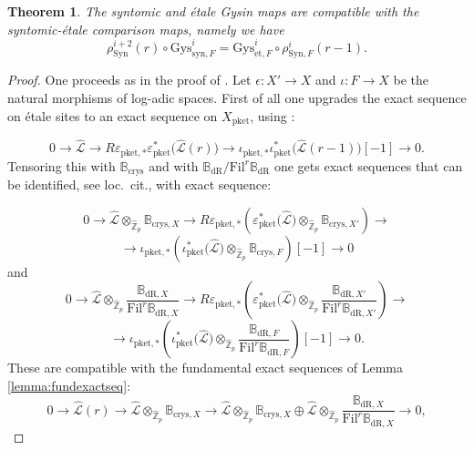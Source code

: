 \documentclass[asterisque,english]{smfart}
\newtheorem{theorem}{Theorem}[]
\begin{document}
\begin{theorem}\label{thm:Gysinandsyntcomp} The syntomic and \'etale Gysin maps are compatible with the syntomic-\'etale comparison maps, namely we have $$\rho_{\mathrm{Syn}}^{i+2}(r) \circ \mathrm{Gys}_{\mathrm{syn},F}^i= \mathrm{Gys}_{\mathrm{et},F}^i \circ \rho_{\mathrm{Syn},F}^{i}(r-1). $$

\end{theorem}
\begin{proof} One proceeds as in the proof of \cite[Prop. 4.3.17]{LLZ}. Let $\epsilon\colon X'\to X$ and $\iota\colon F\to X$ be the natural morphisms of log-adic spaces.  First of all one upgrades the exact sequence on \'etale sites to an exact sequence on $X_{\mathrm{pket}}$, using \cite[Lemma 4.5.7 \& Lemma 4.5.8]
{DLLZa}:

$$0\longrightarrow \widehat{\mathcal{L}} \longrightarrow R\varepsilon_{\mathrm{pket},\ast} \varepsilon_{\mathrm{pket}}^\ast\bigl(\widehat{\mathcal{L}}(r) \bigr) \longrightarrow  \iota_{\mathrm{pket},\ast} \iota_{\mathrm{pket}}^\ast\bigl(\widehat{\mathcal{L}}(r-1) \bigr) [-1] \longrightarrow 0.$$
Tensoring this with $\mathbb{B}_{\mathrm{crys}}$ and with $\mathbb{B}_{\mathrm{dR}}/\mathrm{Fil}^r \mathbb{B}_{\mathrm{dR}}$ one gets exact sequences that can be identified, see loc.~cit., with exact sequence:
 
$$0\longrightarrow \widehat{\mathcal{L}}\otimes_{\widehat{\mathbb{Z}}_p}  \mathbb{B}_{\mathrm{crys},X} \longrightarrow R\varepsilon_{\mathrm{pket},\ast}\left( \varepsilon_{\mathrm{pket}}^\ast\bigl(\widehat{\mathcal{L}}\bigr)\otimes_{\widehat{\mathbb{Z}}_p}  \mathbb{B}_{\mathrm{crys},X'}\right) \longrightarrow $$ $$\longrightarrow \iota_{\mathrm{pket},\ast}\left( \iota_{\mathrm{pket}}^\ast\bigl(\widehat{\mathcal{L}}\bigr)\otimes_{\widehat{\mathbb{Z}}_p}  \mathbb{B}_{\mathrm{crys},F}\right)[-1] \longrightarrow 0$$and
$$0\longrightarrow \widehat{\mathcal{L}}\otimes_{\widehat{\mathbb{Z}}_p}\frac{\mathbb{B}_{\mathrm{dR},X}}{\mathrm{Fil}^r\mathbb{B}_{\mathrm{dR},X} } \longrightarrow R\varepsilon_{\mathrm{pket},\ast}\left( \varepsilon_{\mathrm{pket}}^\ast\bigl(\widehat{\mathcal{L}}\bigr)\otimes_{\widehat{\mathbb{Z}}_p}  \frac{\mathbb{B}_{\mathrm{dR},X'}}{\mathrm{Fil}^r\mathbb{B}_{\mathrm{dR},X'} }\right) \longrightarrow $$ $$\longrightarrow \iota_{\mathrm{pket},\ast}\left( \iota_{\mathrm{pket}}^\ast\bigl(\widehat{\mathcal{L}}\bigr)\otimes_{\widehat{\mathbb{Z}}_p} \frac{\mathbb{B}_{\mathrm{dR},F}}{\mathrm{Fil}^r\mathbb{B}_{\mathrm{dR},F} }\right)[-1] \longrightarrow 0.$$These are compatible with the fundamental  exact sequences  of Lemma \ref{lemma:fundexactseq}:
$$
0 \to \widehat{\mathcal{L}}(r)  \longrightarrow  \widehat{\mathcal{L}}\otimes_{\widehat{\mathbb{Z}}_p}  \mathbb{B}_{\mathrm{crys},X}  {\longrightarrow} \widehat{\mathcal{L}}\otimes_{\widehat{\mathbb{Z}}_p}  \mathbb{B}_{\mathrm{crys},X}  \oplus \widehat{\mathcal{L}}\otimes_{\widehat{\mathbb{Z}}_p} \frac{\mathbb{B}_{\mathrm{dR},X}}{\mathrm{Fil}^r\mathbb{B}_{\mathrm{dR},X} } \longrightarrow 0,$$


\end{proof}
\end{document}
